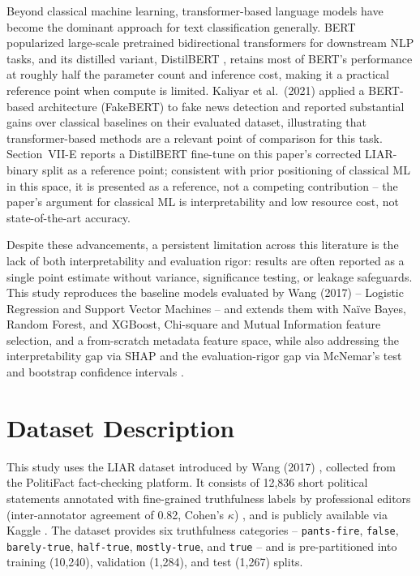 \documentclass[conference]{IEEEtran}
\begin{document}
Beyond classical machine learning, transformer-based language models have become
the dominant approach for text classification generally. BERT
\cite{devlin2019bert} popularized large-scale pretrained bidirectional transformers
for downstream NLP tasks, and its distilled variant, DistilBERT
\cite{sanh2019distilbert}, retains most of BERT's performance at roughly half the
parameter count and inference cost, making it a practical reference point when
compute is limited. Kaliyar et al.\ (2021) \cite{kaliyar2021fakebert} applied a
BERT-based architecture (FakeBERT) to fake news detection and reported
substantial gains over classical baselines on their evaluated dataset, illustrating
that transformer-based methods are a relevant point of comparison for this task.
Section~VII-E reports a DistilBERT fine-tune on this paper's corrected LIAR-binary
split as a reference point; consistent with prior positioning of classical ML in
this space, it is presented as a reference, not a competing contribution -- the
paper's argument for classical ML is interpretability and low resource cost, not
state-of-the-art accuracy.

Despite these advancements, a persistent limitation across this literature is the
lack of both interpretability and evaluation rigor: results are often reported as a
single point estimate without variance, significance testing, or leakage
safeguards. This study reproduces the baseline models evaluated by Wang (2017)
\cite{wang2017} -- Logistic Regression and Support Vector Machines -- and extends
them with Na\"ive Bayes, Random Forest, and XGBoost, Chi-square and Mutual
Information feature selection, and a from-scratch metadata feature space, while
also addressing the interpretability gap via SHAP \cite{lundberg2017shap,
adadi2018peeking} and the evaluation-rigor gap via McNemar's test
\cite{mcnemar1947} and bootstrap confidence intervals \cite{efron1979bootstrap}.

\section{Dataset Description}
This study uses the LIAR dataset introduced by Wang (2017) \cite{wang2017},
collected from the PolitiFact fact-checking platform. It consists of 12,836 short
political statements annotated with fine-grained truthfulness labels by
professional editors (inter-annotator agreement of 0.82, Cohen's $\kappa$)
\cite{wang2017}, and is publicly available via Kaggle \cite{quan_liar_kaggle}. The
dataset provides six truthfulness categories -- \texttt{pants-fire},
\texttt{false}, \texttt{barely-true}, \texttt{half-true}, \texttt{mostly-true}, and
\texttt{true} -- and is pre-partitioned into training (10,240), validation (1,284),
and test (1,267) splits.
\end{document}
